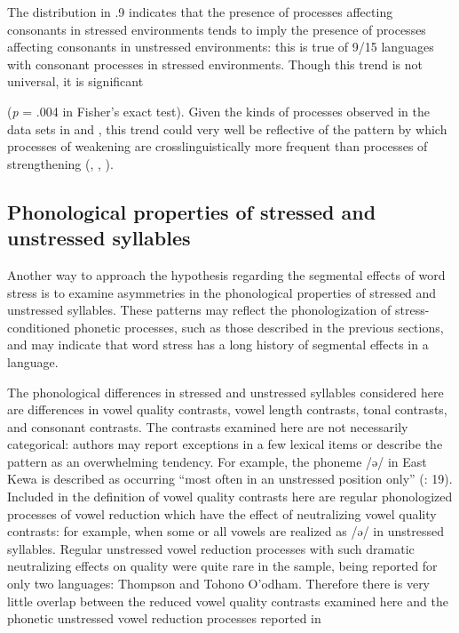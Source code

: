   The distribution in .9 indicates that the presence of processes affecting consonants in stressed environments tends to imply the presence of processes affecting consonants in unstressed environments: this is true of 9/15 languages with consonant processes in stressed environments. Though this trend is not universal, it is significant 

(\textit{p} = .004 in Fisher’s exact test). Given the kinds of processes observed in the data sets in  and , this trend could very well be reflective of the pattern by which processes of weakening are crosslinguistically more frequent than processes of strengthening (\citealt{BybeeEasterday2019}, \citealt{Bybee2015b}, \citealt{Lavoie2015}).

\subsection{Phonological properties of stressed and unstressed syllables}\label{sec:5.4.4}

  Another way to approach the hypothesis regarding the segmental effects of word stress is to examine asymmetries in the phonological properties of stressed and unstressed syllables. These patterns may reflect the phonologization of stress-conditioned phonetic processes, such as those described in the previous sections, and may indicate that word stress has a long history of segmental effects in a language.

  The phonological differences in stressed and unstressed syllables considered here are differences in vowel quality contrasts, vowel length contrasts, tonal contrasts, and consonant contrasts. The contrasts examined here are not necessarily categorical: authors may report exceptions in a few lexical items or describe the pattern as an overwhelming tendency. For example, the phoneme /ə/ in East Kewa is described as occurring “most often in an unstressed position only” (\citealt{FranklinFranklin1978}: 19). Included in the definition of vowel quality contrasts here are regular phonologized processes of vowel reduction which have the effect of neutralizing vowel quality contrasts: for example, when some or all vowels are realized as /ə/ in unstressed syllables. Regular unstressed vowel reduction processes with such dramatic neutralizing effects on quality were quite rare in the sample, being reported for only two languages: Thompson and Tohono O’odham. Therefore there is very little overlap between the reduced vowel quality contrasts examined here and the phonetic unstressed vowel reduction processes reported in 

